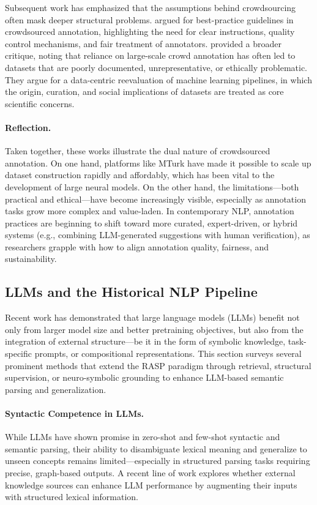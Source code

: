 Subsequent work has emphasized that the assumptions behind crowdsourcing often mask deeper structural problems. \citet{sabou2014corpus} argued for best-practice guidelines in crowdsourced annotation, highlighting the need for clear instructions, quality control mechanisms, and fair treatment of annotators. \citet{paullada2021data} provided a broader critique, noting that reliance on large-scale crowd annotation has often led to datasets that are poorly documented, unrepresentative, or ethically problematic. They argue for a data-centric reevaluation of machine learning pipelines, in which the origin, curation, and social implications of datasets are treated as core scientific concerns.

\paragraph{Reflection.} Taken together, these works illustrate the dual nature of crowdsourced annotation. On one hand, platforms like MTurk have made it possible to scale up dataset construction rapidly and affordably, which has been vital to the development of large neural models. On the other hand, the limitations—both practical and ethical—have become increasingly visible, especially as annotation tasks grow more complex and value-laden. In contemporary NLP, annotation practices are beginning to shift toward more curated, expert-driven, or hybrid systems (e.g., combining LLM-generated suggestions with human verification), as researchers grapple with how to align annotation quality, fairness, and sustainability.

\subsection{LLMs and the Historical NLP Pipeline}

Recent work has demonstrated that large language models (LLMs) benefit not only from larger model size and better pretraining objectives, but also from the integration of external structure—be it in the form of symbolic knowledge, task-specific prompts, or compositional representations. This section surveys several prominent methods that extend the RASP paradigm through retrieval, structural supervision, or neuro-symbolic grounding to enhance LLM-based semantic parsing and generalization.

\paragraph{Syntactic Competence in LLMs.} While LLMs have shown promise in zero-shot and few-shot syntactic and semantic parsing, their ability to disambiguate lexical meaning and generalize to unseen concepts remains limited—especially in structured parsing tasks requiring precise, graph-based outputs. A recent line of work explores whether external knowledge sources can enhance LLM performance by augmenting their inputs with structured lexical information.

